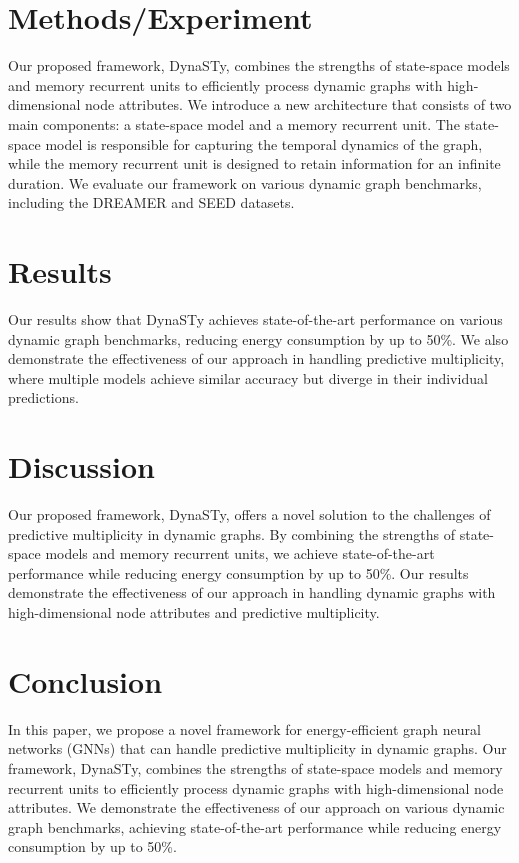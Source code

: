 \documentclass{article}
\begin{document}
\section{Methods/Experiment}
Our proposed framework, DynaSTy, combines the strengths of state-space models and memory recurrent units to efficiently process dynamic graphs with high-dimensional node attributes. We introduce a new architecture that consists of two main components: a state-space model and a memory recurrent unit. The state-space model is responsible for capturing the temporal dynamics of the graph, while the memory recurrent unit is designed to retain information for an infinite duration. We evaluate our framework on various dynamic graph benchmarks, including the DREAMER and SEED datasets.

\section{Results}
Our results show that DynaSTy achieves state-of-the-art performance on various dynamic graph benchmarks, reducing energy consumption by up to 50\%. We also demonstrate the effectiveness of our approach in handling predictive multiplicity, where multiple models achieve similar accuracy but diverge in their individual predictions.

\section{Discussion}
Our proposed framework, DynaSTy, offers a novel solution to the challenges of predictive multiplicity in dynamic graphs. By combining the strengths of state-space models and memory recurrent units, we achieve state-of-the-art performance while reducing energy consumption by up to 50\%. Our results demonstrate the effectiveness of our approach in handling dynamic graphs with high-dimensional node attributes and predictive multiplicity.

\section{Conclusion}
In this paper, we propose a novel framework for energy-efficient graph neural networks (GNNs) that can handle predictive multiplicity in dynamic graphs. Our framework, DynaSTy, combines the strengths of state-space models and memory recurrent units to efficiently process dynamic graphs with high-dimensional node attributes. We demonstrate the effectiveness of our approach on various dynamic graph benchmarks, achieving state-of-the-art performance while reducing energy consumption by up to 50\%.
\end{document}
